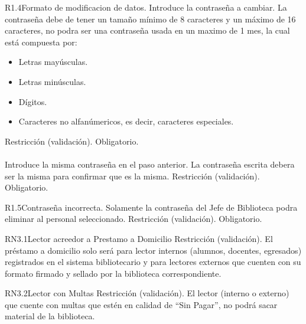 \begin{BussinesRule}{R1.4}{Formato de modificacion de datos.}
	\BRitem[Contraseña:] Introduce la contraseña a cambiar.
	\BRitem[Descripción:] La contraseña debe de tener un tamaño mínimo de 8 caracteres y un máximo de 16 caracteres, no podra ser una contraseña usada en un maximo de 1 mes, la cual está compuesta por:
		\begin{itemize}	
			\item Letras mayúsculas.
			\item Letras minúsculas.
			\item Dígitos.
			\item Caracteres no alfanúmericos, es decir, caracteres especiales.
		\end{itemize}
	\BRitem[Tipo:] Restricción (validación).
	\BRitem[Nivel:] Obligatorio.\\\\

	 Introduce la misma contraseña en el paso anterior.
	\BRitem[Descripción:] La contraseña escrita debera ser la misma para confirmar que es la misma.
	\BRitem[Tipo:] Restricción (validación).
	\BRitem[Nivel:] Obligatorio.

\end{BussinesRule}

\begin{BussinesRule}{R1.5}{Contraseña incorrecta.} 
	\BRitem[Descripción:] Solamente la contraseña del Jefe de Biblioteca podra eliminar al personal seleccionado.
	\BRitem[Tipo:] Restricción (validación).
	\BRitem[Nivel:] Obligatorio.
\end{BussinesRule}


\begin{BussinesRule}{RN3.1}{Lector acreedor a Prestamo a Domicilio} 
	\BRitem[Tipo:] Restricción (validación).
	\BRitem[Descripción:]El préstamo a domicilio solo será para lector internos (alumnos, docentes, egresados) registrados en el sistema bibliotecario y para lectores externos que cuenten con su formato firmado y sellado por la biblioteca correspondiente.
\end{BussinesRule}

\begin{BussinesRule}{RN3.2}{Lector con Multas} 
	\BRitem[Tipo:] Restricción (validación).
	\BRitem[Descripción:]El lector (interno o externo) que cuente con multas que estén en calidad de “Sin Pagar”, no podrá sacar material de la biblioteca.
\end{BussinesRule}

